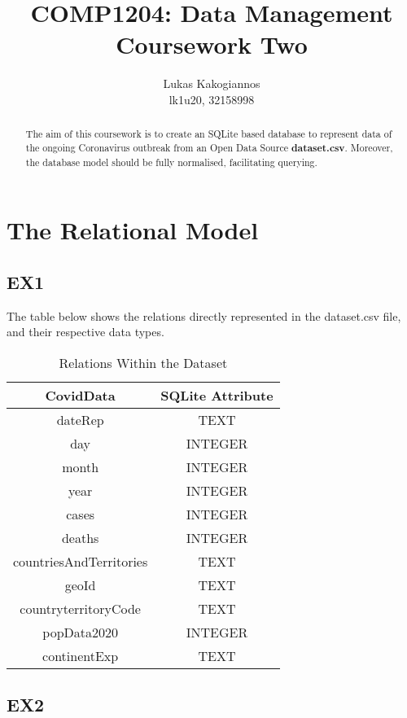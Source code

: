 \documentclass{article}
\title{COMP1204: Data Management \\ Coursework Two}
\author{Lukas Kakogiannos \\ lk1u20, 32158998}
\begin{document}
\maketitle

\begin{abstract}
    The aim of this coursework is to create an SQLite based database to represent data of the ongoing Coronavirus outbreak from an Open Data Source \textbf{dataset.csv}. Moreover, the database model should be fully normalised, facilitating querying.
\end{abstract}

\section{The Relational Model}

\subsection{EX1}

The table below shows the relations directly represented in the dataset.csv file, and their respective data types.

\begin{table}[ht]
    \caption{Relations Within the Dataset}
    \vspace{5pt}
    \centering
    \begin{tabular}{c c}
    \hline\hline
      CovidData  & SQLite Attribute \\ [0.5ex]
    \hline
      dateRep  & TEXT \\
      day  & INTEGER \\
      month  & INTEGER \\
      year  & INTEGER \\
      cases  & INTEGER \\
      deaths  & INTEGER \\
      countriesAndTerritories  & TEXT \\
      geoId  & TEXT \\
      countryterritoryCode  & TEXT \\
      popData2020  & INTEGER \\
      continentExp  & TEXT \\ [0.5ex]
    \hline
    \end{tabular}
    \label{tab:relations}
\end{table}

\subsection{EX2}
\end{document}
